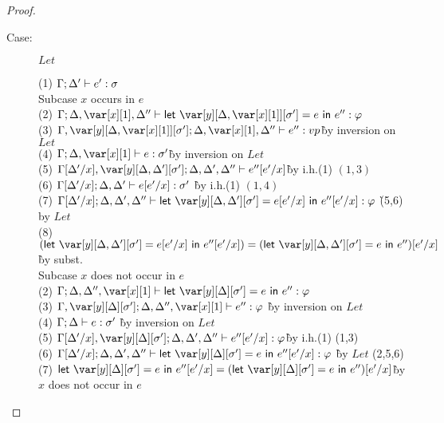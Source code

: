 \begin{proof}
\begin{description}
\item[Case:] $Let$
\begin{tabbing}
  (1) $\Gamma; \Delta' \vdash e' : \sigma$\\
  Subcase $x$ occurs in $e$\\
  (2) $\G; \D, \xl, \D'' \vdash \llet{\y[\D,\xl][\s'] = e}{e''} : \vp$\\
  (3) $\G,\y[\D,\xl][\s']; \D, \xl, \D'' \vdash e'' : vp$\` by inversion on $Let$\\
  (4) $\G; \D, \xl \vdash e : \s'$\` by inversion on $Let$\\
  (5) $\G[\D'/x],\y[\D,\D'][\s']; \D, \D', \D'' \vdash e''[e'/x]$\` by i.h.(1) $(1,3)$\\
  (6) $\Gamma[\Delta'/x]; \Delta, \Delta' \vdash e[e'/x] : \sigma'$ \` by i.h.(1) $(1,4)$\\
  (7) $\G[\D'/x]; \D, \D', \D'' \vdash \llet{\y[\D,\D'][\s'] = e[e'/x]}{e''[e'/x]} : \vp$ \` (5,6) by $Let$\\
  (8) $(\llet{\y[\D,\D'][\s'] = e[e'/x]}{e''[e'/x]}) = (\llet{\y[\D,\D'][\s'] = e}{e''})[e'/x]$ \` by subst.\\
  Subcase $x$ does not occur in $e$\\
  (2) $\G; \D, \D'', \xl  \vdash \llet{\yD = e}{e''} : \vp$\\
  (3) $\G,\yD; \D, \D'', \xl \vdash e'' : \vp$ \` by inversion on $Let$\\
  (4) $\Gamma; \Delta \vdash e : \sigma'$ \` by inversion on $Let$\\
  (5) $\G[\D'/x],\yD; \D, \D', \D'' \vdash e''[e'/x] : \vp$\` by i.h.(1) (1,3)\\
  (6) $\G[\D'/x]; \D, \D', \D'' \vdash \llet{\yD = e}{e''[e'/x]} : \vp$ \` by $Let$ (2,5,6)\\
  (7) $\llet{\yD = e}{e''[e'/x]} = (\llet{\yD = e}{e''})[e'/x]$\` by $x$ does
  not occur in $e$\\
\end{tabbing}


\end{description}
\end{proof}

